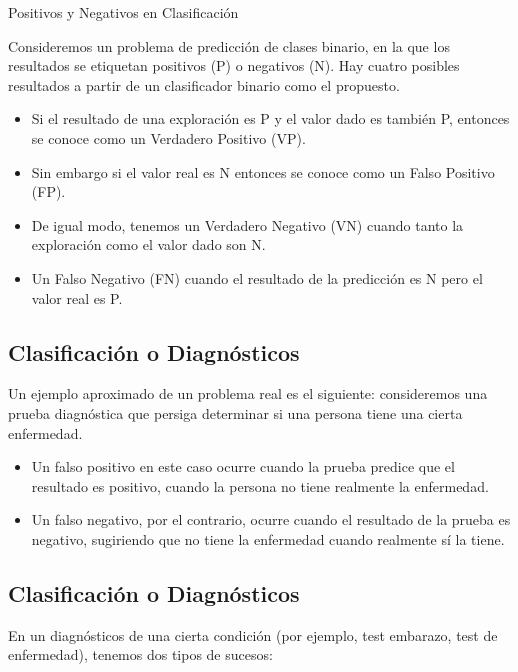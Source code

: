 \documentclass[]{book}
\providecommand{\tightlist}{%
  \setlength{\itemsep}{0pt}\setlength{\parskip}{0pt}}
\begin{document}
Positivos y Negativos en Clasificación

Consideremos un problema de predicción de clases binario, en la que los resultados se etiquetan positivos (P) o negativos (N). Hay cuatro posibles resultados a partir de un clasificador binario como el propuesto.

\begin{itemize}
\tightlist
\item
  Si el resultado de una exploración es P y el valor dado es también P, entonces se conoce como un Verdadero Positivo (VP).
\item
  Sin embargo si el valor real es N entonces se conoce como un Falso Positivo (FP).
\item
  De igual modo, tenemos un Verdadero Negativo (VN) cuando tanto la exploración como el valor dado son N.
\item
  Un Falso Negativo (FN) cuando el resultado de la predicción es N pero el valor real es P.
\end{itemize}

\hypertarget{clasificaciuxf3n-o-diagnuxf3sticos-5}{%
\subsection{Clasificación o Diagnósticos}\label{clasificaciuxf3n-o-diagnuxf3sticos-5}}

Un ejemplo aproximado de un problema real es el siguiente: consideremos una prueba diagnóstica que persiga determinar si una persona tiene una cierta enfermedad.

\begin{itemize}
\tightlist
\item
  Un falso positivo en este caso ocurre cuando la prueba predice que el resultado es positivo, cuando la persona no tiene realmente la enfermedad.
\item
  Un falso negativo, por el contrario, ocurre cuando el resultado de la prueba es negativo, sugiriendo que no tiene la enfermedad cuando realmente sí la tiene.
\end{itemize}

\hypertarget{clasificaciuxf3n-o-diagnuxf3sticos-6}{%
\subsection{Clasificación o Diagnósticos}\label{clasificaciuxf3n-o-diagnuxf3sticos-6}}

En un diagnósticos de una cierta condición (por ejemplo, test embarazo, test de enfermedad), tenemos dos tipos de sucesos:
\end{document}

